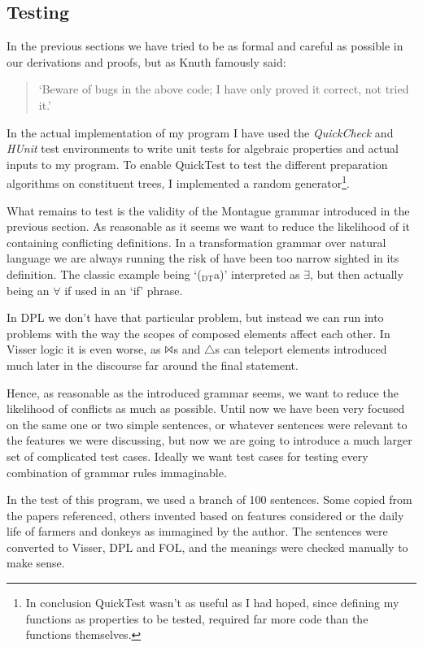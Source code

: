 \documentclass[12pt]{article}
\begin{document}
\subsection{Testing}
In the previous sections we have tried to be as formal and careful as possible in our derivations and proofs, but as Knuth famously said:

\begin{quotation}
`Beware of bugs in the above code; I have only proved it correct, not tried it.'
\end{quotation}

In the actual implementation of my program I have used the \emph{QuickCheck} and \emph{HUnit} test environments to write unit tests for algebraic properties and actual inputs to my program. To enable QuickTest to test the different preparation algorithms on constituent trees, I implemented a random generator\footnote{In conclusion QuickTest wasn't as useful as I had hoped, since defining my functions as properties to be tested, required far more code than the functions themselves.}.

What remains to test is the validity of the Montague grammar introduced in the previous section. As reasonable as it seems we want to reduce the likelihood of it containing conflicting definitions. In a transformation grammar over natural language we are always running the risk of have been too narrow sighted in its definition. The classic example being `($_\text{DT}$a)' interpreted as $\exists$, but then actually being an $\forall$ if used in an `if' phrase.

In DPL we don't have that particular problem, but instead we can run into problems with the way the scopes of composed elements affect each other. In Visser logic it is even worse, as $\Bowtie$s and $\triangle$s can teleport elements introduced much later in the discourse far around the final statement.

Hence, as reasonable as the introduced grammar seems, we want to reduce the likelihood of conflicts as much as possible. Until now we have been very focused on the same one or two simple sentences, or whatever sentences were relevant to the features we were discussing, but now we are going to introduce a much larger set of complicated test cases. Ideally we want test cases for testing every combination of grammar rules immaginable.

In the test of this program, we used a branch of 100 sentences. Some copied from the papers referenced, others invented based on features considered or the daily life of farmers and donkeys as immagined by the author. The sentences were converted to Visser, DPL and FOL, and the meanings were checked manually to make sense.
\end{document}
